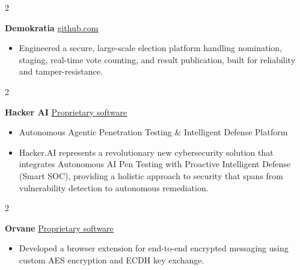 \documentclass[10pt, a4paper]{article}
\newenvironment{highlights}{
    \begin{itemize}[
        topsep=0.10 cm,
        parsep=0.10 cm,
        partopsep=0pt,
        itemsep=0pt,
        leftmargin=0 cm + 10pt
    ]
}{
    \end{itemize}
} %
\newenvironment{twocolentry}[2][]{
    \onecolentry
    \def\secondColumn{#2}
    \setcolumnwidth{\fill, 4.5 cm}
    \begin{paracol}{2}
}{
    \switchcolumn \raggedleft \secondColumn
    \end{paracol}
    \endonecolentry
} %
\begin{document}
        \begin{twocolentry}{
            \href{https://github.com/TimsTittus/Demokratia}{\underline{github.com}}
        }
            \textbf{Demokratia}\end{twocolentry}

        \vspace{0.01 cm}

            \begin{highlights}
                \item Engineered a secure, large-scale election platform handling nomination, staging, real-time vote counting, and result publication, built for reliability and tamper-resistance.
            \end{highlights}

        \begin{twocolentry}{
            \href{https://github.com/TimsTittus/Hacker-AI}{\underline{Proprietary software}}
        }

                \vspace{0.01 cm}

            \textbf{Hacker AI}\end{twocolentry}

        \vspace{0.01 cm}
        
            \begin{highlights}
                \item Autonomous Agentic Penetration Testing \& Intelligent Defense Platform
                \item Hacker.AI represents a revolutionary new cybersecurity solution that integrates Autonomous AI Pen Testing with Proactive Intelligent Defense (Smart SOC), providing a holistic approach to security that spans from vulnerability detection to autonomous remediation.
            \end{highlights}

        \vspace{0.01 cm}
            
            \begin{twocolentry}{
            \href{https://github.com/TimsTittus/Orvane}{\underline{Proprietary software}}
        }
            \textbf{Orvane}\end{twocolentry}

        \vspace{0.01 cm}
        
            \begin{highlights}
                \item Developed a browser extension for end-to-end encrypted messaging using custom AES encryption and ECDH key exchange.

            \end{highlights}
\end{document}
